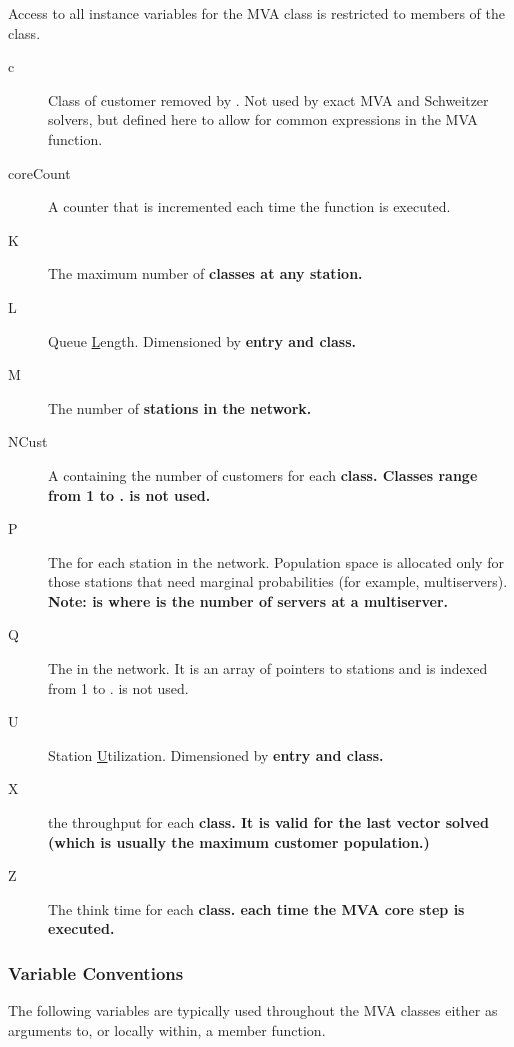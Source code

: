 Access to all instance variables for the MVA class is restricted to
members of the class.  
\begin{description}
\item[c] \texonly{---} Class of customer removed by
  .  Not used by exact MVA and
  Schweitzer solvers, but defined here to allow for common expressions
  in the MVA  function.
\item[coreCount] \texonly{---} A counter that is incremented each time
  the  function is executed.
\item[K] \texonly{---} The maximum number of \bf{classes} at any station.
\item[L] \texonly{---} Queue \underline{L}ength.  Dimensioned by \bf{entry} and \bf{class}.
\item[M] \texonly{---} The number of \bf{stations} in the network.
\item[NCust] \texonly{---} A  containing the number of
  customers for each \bf{class}.  Classes range from 1 to .
   is not used.
\item[P] \texonly{---} The  for each station in the network.
  Population space is allocated only for those stations that need
  marginal probabilities (for example, multiservers).  \bf{Note:}
   is  where  is the number of
  servers at a multiserver.
\item[Q] \texonly{---} The  in the network.  It is an
  array of pointers to stations and is indexed from 1 to .
   is not used.  
\item[U] \texonly{---} Station \underline{U}tilization.  Dimensioned by \bf{entry}
  and \bf{class}. 
\item[X] \texonly{---} the throughput for each \bf{class}.  It is
  valid for the last  vector solved
  (which is usually the maximum customer population.)
\item[Z] \texonly{---} The think time for each \bf{class}.
each time the MVA core step is executed.
\end{description}

\subsubsection{Variable Conventions}
The following variables are typically used throughout the MVA classes
either as arguments to, or locally within, a member function.

